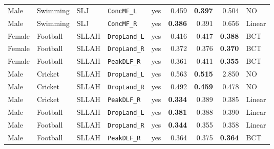 {\begin{longtable}{lllllrrrl}
Male & Swimming & SLJ & \texttt{ConcMF\_L} & yes & 0.459 & \textbf{0.397} & 0.504 & NO \\
Male & Swimming & SLJ & \texttt{ConcMF\_R} & yes & \textbf{0.386} & 0.391 & 0.656 & Linear \\
\addlinespace[1pt]
Female & Football & SLLAH & \texttt{DropLand\_L} & yes & 0.416 & 0.417 & \textbf{0.388} & BCT \\
Female & Football & SLLAH & \texttt{DropLand\_R} & yes & 0.372 & 0.376 & \textbf{0.370} & BCT \\
Female & Football & SLLAH & \texttt{PeakDLF\_R} & yes & 0.361 & 0.411 & \textbf{0.355} & BCT \\
Male & Cricket & SLLAH & \texttt{DropLand\_L} & yes & 0.563 & \textbf{0.515} & 2.850 & NO \\
Male & Cricket & SLLAH & \texttt{DropLand\_R} & yes & 0.492 & \textbf{0.459} & 0.478 & NO \\
Male & Cricket & SLLAH & \texttt{PeakDLF\_R} & yes & \textbf{0.334} & 0.389 & 0.385 & Linear \\
Male & Football & SLLAH & \texttt{DropLand\_L} & yes & \textbf{0.381} & 0.388 & 0.390 & Linear \\
Male & Football & SLLAH & \texttt{DropLand\_R} & yes & \textbf{0.344} & 0.355 & 0.358 & Linear \\
Male & Football & SLLAH & \texttt{PeakDLF\_R} & yes & 0.364 & 0.375 & \textbf{0.364} & BCT \\
\end{longtable}
}
